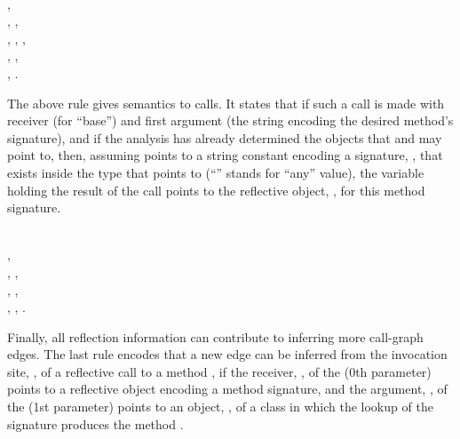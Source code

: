 \begin{minipage}{0.95\columnwidth}
  \begin{rules}
      \\
    \tab {},
    \\
    \tab {}, ,
    \\
    \tab {}, , ,
    \\
    \tab {}, ,
    \\ %
    \tab {}, .
    \\ %
  \end{rules}
\end{minipage}

\noindent The above rule gives semantics to  calls.  It
states that if such a call is made with receiver  (for
``base'') and first argument  (the string encoding the desired
method's signature), and if the analysis has already determined the
objects that  and  may point to, then, assuming
 points to a string constant encoding a signature, ,
that exists inside the type that  points to (``\args{\_}''
stands for ``any'' value), the variable  holding the result of the
 call points to the reflective object,
, for this method signature.

\begin{minipage}{0.95\columnwidth}
  \begin{rules}
      \\
    \tab {}, \\
    \tab {}, , \\
    \tab {}, , \\
    \tab {}, , .\\
  \end{rules}
\end{minipage}

\noindent Finally, all reflection information can contribute to inferring more
call-graph edges. The last rule encodes that a new edge can be
inferred from the invocation site, , of a reflective  call to a
method , if the receiver, , of the  (0th parameter) points to a
reflective object encoding a method signature, and the argument,
, of the  (1st parameter) points to an object,
, of a class in which the lookup of the signature produces
the method .


